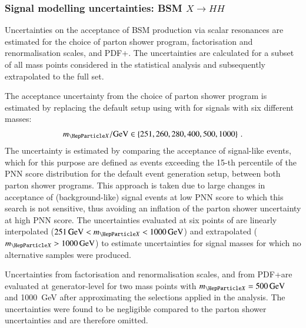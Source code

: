 
\subsubsection{Signal modelling uncertainties: BSM $X \to HH$}

Uncertainties on the acceptance of BSM \HH production via scalar
resonances are estimated for the choice of parton shower program,
factorisation and renormalisation scales, and PDF+\alphas. The
uncertainties are calculated for a subset of all mass points
considered in the statistical analysis and subsequently extrapolated
to the full set.


The acceptance uncertainty from the choice of parton shower program is
estimated by replacing the default setup using \HERWIG[7.1.3] with
\PYTHIA[8.235] for signals with six different masses:
\begin{align*}
  \mX / \si{\GeV} \in \left\{ 251, 260, 280, 400, 500, 1000
\right\} \,\text{.}
\end{align*}
The uncertainty is estimated by comparing the acceptance of
signal-like events, which for this purpose are defined as events
exceeding the 15-th percentile of the PNN score distribution for the
default event generation setup, between both parton shower
programs. This approach is taken due to large changes in acceptance of
(background-like) signal events at low PNN score to which this search
is not sensitive, thus avoiding an inflation of the parton shower
uncertainty at high PNN score. The uncertainties evaluated at six
points of \mX are linearly interpolated
($\SI{251}{\GeV} < \mX < \SI{1000}{\GeV}$) and extrapolated
($\mX > \SI{1000}{\GeV}$) to estimate uncertainties for signal masses
for which no alternative samples were produced.

Uncertainties from factorisation and renormalisation scales, and from
PDF+\alphas are evaluated at generator-level for two mass points with
$\mX = \SI{500}{\GeV}$ and \SI{1000}{\GeV} after approximating the
selections applied in the analysis. The uncertainties were found to be
negligible compared to the parton shower uncertainties and are
therefore omitted.

